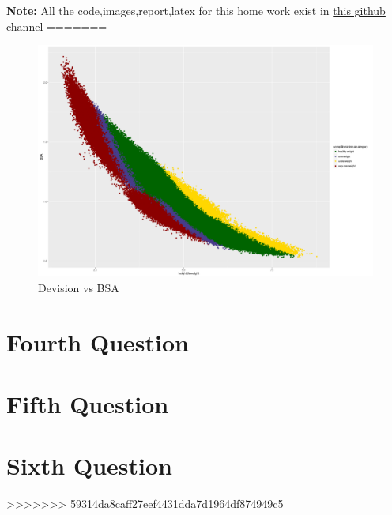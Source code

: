 \documentclass{article}
\begin{document}
\textbf{\Large Note:} All the code,images,report,latex for this home work exist in \href{https://github.com/aqeel13932/DM/tree/master/HW04}{this github channel}
=======
				\begin{figure}[H]
					\begin{center}
						\includegraphics[scale=0.4]{divbsa.png}
					\end{center}
					\caption{Devision vs BSA}
				\end{figure}
	\section*{Fourth Question}
	\section*{Fifth Question}
	\section*{Sixth Question}
>>>>>>> 59314da8caff27eef4431dda7d1964df874949c5
\end{document}
